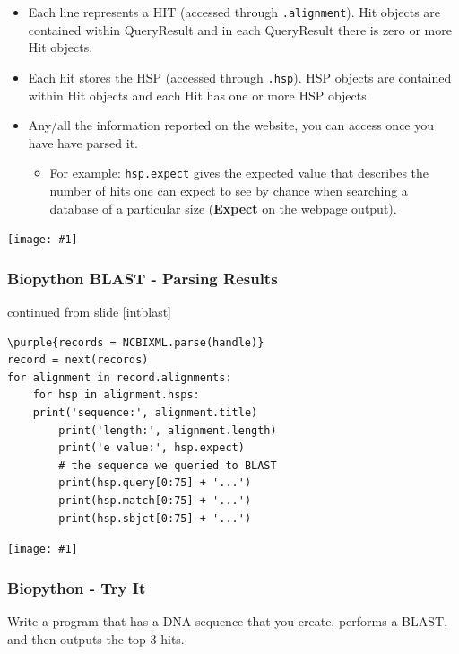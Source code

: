\documentclass[xcolor=svgnames, handout]{beamer}
\newcommand{\purple}[1]{{\textcolor{purple}{#1}}}
\newcommand{\nl}{\\[1em]}
\newcommand{\ipic}[2]{\texttt{[image: \#1]}}
\newcommand{\ft}[1]{\frametitle{#1}}
\begin{document}
\begin{frame}
\begin{itemize}
\item Each line represents a HIT (accessed through {\tt .alignment}). Hit objects are contained within QueryResult and in each QueryResult there is zero or more Hit objects.\nl
\item Each hit stores the HSP (accessed through {\tt .hsp}).  HSP objects are contained within Hit objects and each Hit has one or more HSP objects.  \nl
\item Any/all the information reported on the website, you can access once you have have parsed it. 
\begin{itemize}
\item For example: {\tt hsp.expect} gives the  expected value that describes the number of hits one can expect to see by chance when searching a database of a particular size ({\bf Expect} on the webpage output).
\end{itemize}

\end{itemize}
\end{frame}


\begin{frame}
\ipic{img/hsp2}{1.0}
\end{frame}



\begin{frame}[fragile]\ft{Biopython BLAST - Parsing Results}
continued from slide \ref{intblast}
\begin{Verbatim}[xleftmargin=.1in, commandchars=\\\{\}] 
\purple{records = NCBIXML.parse(handle)}
record = next(records)
for alignment in record.alignments:
    for hsp in alignment.hsps:
	print('sequence:', alignment.title)
        print('length:', alignment.length)
        print('e value:', hsp.expect)
        # the sequence we queried to BLAST
        print(hsp.query[0:75] + '...')
        print(hsp.match[0:75] + '...')
        print(hsp.sbjct[0:75] + '...')

\end{Verbatim}
\end{frame}


\begin{frame}
\ipic{img/yes2}{1.0}
\end{frame}


\begin{frame}[fragile]\ft{Biopython - Try It}
\begin{example}
Write a program that has a DNA sequence that you create, performs a BLAST, and then outputs the top 3 hits.\end{example}
\end{frame}
\end{document}
